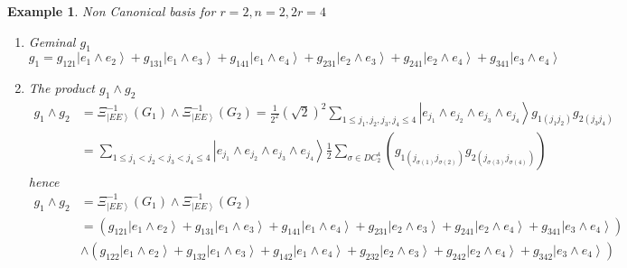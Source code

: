 \documentclass[aps,preprint]{revtex4}%
\newtheorem{example}[theorem]{Example}
\begin{document}
\begin{example}
Non Canonical basis for $r=2,n=2,2r=4$

\begin{enumerate}
\item Geminal $g_{1}$
\begin{equation}
g_{1}=g_{121}\left\vert e_{1}\wedge e_{2}\right\rangle +g_{131}\left\vert
e_{1}\wedge e_{3}\right\rangle +g_{141}\left\vert e_{1}\wedge e_{4}%
\right\rangle +g_{231}\left\vert e_{2}\wedge e_{3}\right\rangle +g_{241}%
\left\vert e_{2}\wedge e_{4}\right\rangle +g_{341}\left\vert e_{3}\wedge
e_{4}\right\rangle
\end{equation}


\item The product $g_{1}\wedge g_{2}$
\begin{align}
g_{1}\wedge g_{2}  &  =\Xi_{\left\vert EE\right\rangle }^{-1}\left(
G_{1}\right)  \wedge\Xi_{\left\vert EE\right\rangle }^{-1}\left(
G_{2}\right)  =\frac{1}{2^{2}}\left(  \sqrt{2}\right)  ^{2}\sum_{1\leq
j_{1},j_{2},j_{3},j_{4}\leq4}\left\vert e_{j_{1}}\wedge e_{j_{2}}\wedge
e_{j_{3}}\wedge e_{j_{4}}\right\rangle g_{1\left(  j_{1}j_{2}\right)
}g_{2\left(  j_{3}j_{4}\right)  }\\
&  =\sum_{1\leq j_{1}<j_{2}<j_{3}<j_{4}\leq4}\left\vert e_{j_{1}}\wedge
e_{j_{2}}\wedge e_{j_{3}}\wedge e_{j_{4}}\right\rangle \frac{1}{2}\sum
_{\sigma\in DC_{2}^{4}}\left(  g_{1\left(  j_{\sigma\left(  1\right)
}j_{\sigma\left(  2\right)  }\right)  }g_{2\left(  j_{\sigma\left(  3\right)
}j_{\sigma\left(  4\right)  }\right)  }\right)
\end{align}
hence
\begin{align}
g_{1}\wedge g_{2}  &  =\Xi_{\left\vert EE\right\rangle }^{-1}\left(
G_{1}\right)  \wedge\Xi_{\left\vert EE\right\rangle }^{-1}\left(  G_{2}\right)
\\
&  =\left(  g_{121}\left\vert e_{1}\wedge e_{2}\right\rangle +g_{131}%
\left\vert e_{1}\wedge e_{3}\right\rangle +g_{141}\left\vert e_{1}\wedge
e_{4}\right\rangle +g_{231}\left\vert e_{2}\wedge e_{3}\right\rangle
+g_{241}\left\vert e_{2}\wedge e_{4}\right\rangle +g_{341}\left\vert
e_{3}\wedge e_{4}\right\rangle \right) \\
&  \wedge\left(  g_{122}\left\vert e_{1}\wedge e_{2}\right\rangle
+g_{132}\left\vert e_{1}\wedge e_{3}\right\rangle +g_{142}\left\vert
e_{1}\wedge e_{4}\right\rangle +g_{232}\left\vert e_{2}\wedge e_{3}%
\right\rangle +g_{242}\left\vert e_{2}\wedge e_{4}\right\rangle +g_{342}%
\left\vert e_{3}\wedge e_{4}\right\rangle \right) \\

\end{align}
\end{enumerate}
\end{example}
\end{document}
